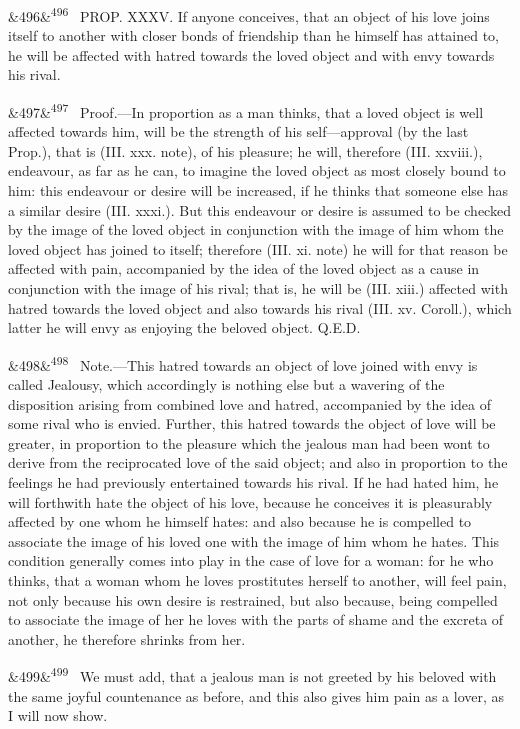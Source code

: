 \documentclass[12pt]{article}
\newcommand{\para}[1][]{\par\noindent\ifx&#1&\else\textsuperscript{\footnotesize #1}~\fi}
\begin{document}
\para[496] PROP. XXXV. If anyone conceives, that an object of his love joins itself to another with closer bonds of friendship than he himself has attained to, he will be affected with hatred towards the loved object and with envy towards his rival.

\para[497] Proof.---In proportion as a man thinks, that a loved object is well affected towards him, will be the strength of his self---approval (by the last Prop.), that is (III. xxx. note), of his pleasure; he will, therefore (III. xxviii.), endeavour, as far as he can, to imagine the loved object as most closely bound to him: this endeavour or desire will be increased, if he thinks that someone else has a similar desire (III. xxxi.). But this endeavour or desire is assumed to be checked by the image of the loved object in conjunction with the image of him whom the loved object has joined to itself; therefore (III. xi. note) he will for that reason be affected with pain, accompanied by the idea of the loved object as a cause in conjunction with the image of his rival; that is, he will be (III. xiii.) affected with hatred towards the loved object and also towards his rival (III. xv. Coroll.), which latter he will envy as enjoying the beloved object. Q.E.D.

\para[498] Note.---This hatred towards an object of love joined with envy is called Jealousy, which accordingly is nothing else but a wavering of the disposition arising from combined love and hatred, accompanied by the idea of some rival who is envied. Further, this hatred towards the object of love will be greater, in proportion to the pleasure which the jealous man had been wont to derive from the reciprocated love of the said object; and also in proportion to the feelings he had previously entertained towards his rival. If he had hated him, he will forthwith hate the object of his love, because he conceives it is pleasurably affected by one whom he himself hates: and also because he is compelled to associate the image of his loved one with the image of him whom he hates. This condition generally comes into play in the case of love for a woman: for he who thinks, that a woman whom he loves prostitutes herself to another, will feel pain, not only because his own desire is restrained, but also because, being compelled to associate the image of her he loves with the parts of shame and the excreta of another, he therefore shrinks from her.

\para[499] We must add, that a jealous man is not greeted by his beloved with the same joyful countenance as before, and this also gives him pain as a lover, as I will now show.
\end{document}
